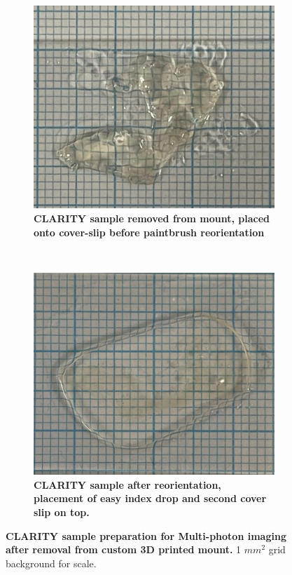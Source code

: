 \begin{figure}[H]
\centering
\begin{subfigure}[t]{0.475\textwidth}
\includegraphics[width=1\linewidth]{Images/Figure3.12a.jpg}
\caption{\textbf{CLARITY sample removed from mount, placed onto cover-slip before paintbrush reorientation}}
\label{fig:enter-label}
\end{subfigure}
~
\begin{subfigure}[t]{0.475\textwidth}
\includegraphics[width=1\linewidth]{Images/Figure3.12b.jpg}
\caption{\textbf{CLARITY sample after reorientation, placement of easy index drop and second cover slip on top.}}
\label{fig:enter-label}
\end{subfigure}
\caption{\textbf{CLARITY sample preparation for Multi-photon imaging after removal from custom 3D printed mount.} 1 $mm^2$ grid background for scale.}
\end{figure}
 

